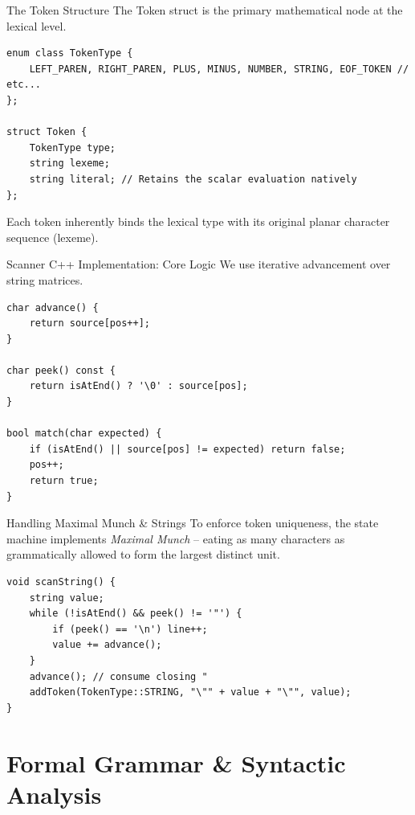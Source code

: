 \documentclass[aspectratio=169]{beamer}
\begin{document}
\begin{frame}[fragile]{The Token Structure}
    The Token struct is the primary mathematical node at the lexical level.
    \begin{lstlisting}
enum class TokenType { 
    LEFT_PAREN, RIGHT_PAREN, PLUS, MINUS, NUMBER, STRING, EOF_TOKEN // etc... 
};

struct Token {
    TokenType type;
    string lexeme;
    string literal; // Retains the scalar evaluation natively
};
    \end{lstlisting}
    Each token inherently binds the lexical type with its original planar character sequence (lexeme).
\end{frame}

\begin{frame}[fragile]{Scanner C++ Implementation: Core Logic}
    We use iterative advancement over string matrices.
    \begin{lstlisting}
char advance() {
    return source[pos++];
}

char peek() const {
    return isAtEnd() ? '\0' : source[pos];
}

bool match(char expected) {
    if (isAtEnd() || source[pos] != expected) return false;
    pos++;
    return true;
}
    \end{lstlisting}
\end{frame}

\begin{frame}[fragile]{Handling Maximal Munch \& Strings}
    To enforce token uniqueness, the state machine implements \textit{Maximal Munch} -- eating as many characters as grammatically allowed to form the largest distinct unit.
    \begin{lstlisting}
void scanString() {
    string value;
    while (!isAtEnd() && peek() != '"') {
        if (peek() == '\n') line++;
        value += advance();
    }
    advance(); // consume closing "
    addToken(TokenType::STRING, "\"" + value + "\"", value);
}
    \end{lstlisting}
\end{frame}


\section{Formal Grammar \& Syntactic Analysis}
\end{document}
